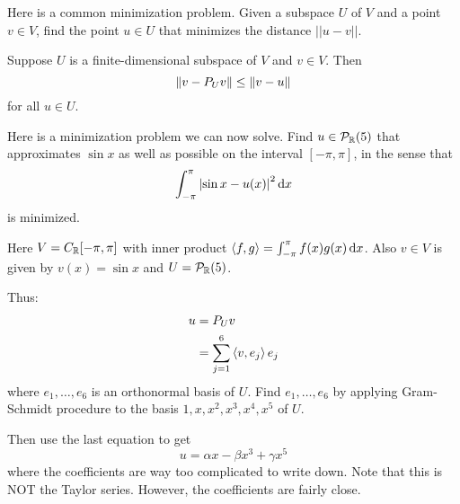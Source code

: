 Here is a common minimization problem.
Given a subspace $U$ of $V$ and a point $v \in V$, find the point $u \in U$ that minimizes the distance
$|| u - v ||$.

\begin{theorem}
    Suppose $U$ is a finite-dimensional subspace of $V$ and $v \in V$. Then
    \[ \norm{v - P_Uv} \leq \norm{v - u} \]
    for all $u \in U$.
\end{theorem}

\begin{example}
    Here is a minimization problem we can now solve. Find $u \in \mathcal{P}_{\operatorname{\mathbb{R}}}(5)$ that approximates
    $\sin x$ as well as possible on the interval $[-\pi, \pi]$, in the sense that
    \[ \int_{-\pi}^{\pi} \abs{\sin x - u(x)}^2 \dd{x} \]
    is minimized.

    Here $V = C_{\operatorname{\mathbb{R}}} [-\pi, \pi]$ with inner product
    $\left\langle f, g \right\rangle = \int_{-\pi}^{\pi} f(x) g(x) \dd{x}$.
    Also $v \in V$ is given by $v(x) = \sin x$ and $U = \mathcal{P}_{\operatorname{\mathbb{R}}}(5)$.

    Thus:
    \begin{align*}
        u &= P_Uv \\
        &= \sum_{j=1}^6 \left\langle v, e_j \right\rangle e_j \\
    \end{align*}
    where $e_1, \dots, e_6$ is an orthonormal basis of $U$.
    Find $e_1, \dots, e_6$ by applying Gram-Schmidt procedure to the basis
    $1, x, x^2, x^3, x^4, x^5$ of $U$.

    Then use the last equation to get
    \[ u = \alpha x - \beta x^3 + \gamma x^5 \]
    where the coefficients are way too complicated to write down. Note that this is NOT
    the Taylor series. However, the coefficients are fairly close.
\end{example}
\endinput